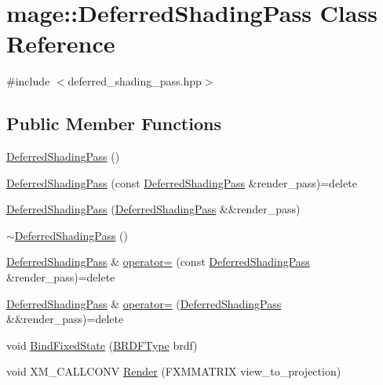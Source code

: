 \hypertarget{classmage_1_1_deferred_shading_pass}{}\section{mage\+:\+:Deferred\+Shading\+Pass Class Reference}
\label{classmage_1_1_deferred_shading_pass}


{\ttfamily \#include $<$deferred\+\_\+shading\+\_\+pass.\+hpp$>$}

\subsection*{Public Member Functions}
\begin{DoxyCompactItemize}
\item 
\hyperlink{classmage_1_1_deferred_shading_pass_a348c86ce12342110299739d8d63c6aaf}{Deferred\+Shading\+Pass} ()
\item 
\hyperlink{classmage_1_1_deferred_shading_pass_a4820a800b8ffc4cf0a7d155b09b71210}{Deferred\+Shading\+Pass} (const \hyperlink{classmage_1_1_deferred_shading_pass}{Deferred\+Shading\+Pass} \&render\+\_\+pass)=delete
\item 
\hyperlink{classmage_1_1_deferred_shading_pass_a1aff32dc53f6e377728898ba362d0116}{Deferred\+Shading\+Pass} (\hyperlink{classmage_1_1_deferred_shading_pass}{Deferred\+Shading\+Pass} \&\&render\+\_\+pass)
\item 
\hyperlink{classmage_1_1_deferred_shading_pass_a0feba3a73c56e1c07abe19fddd890f76}{$\sim$\+Deferred\+Shading\+Pass} ()
\item 
\hyperlink{classmage_1_1_deferred_shading_pass}{Deferred\+Shading\+Pass} \& \hyperlink{classmage_1_1_deferred_shading_pass_afcb5b0299030a2a60dcb3685ca875e3e}{operator=} (const \hyperlink{classmage_1_1_deferred_shading_pass}{Deferred\+Shading\+Pass} \&render\+\_\+pass)=delete
\item 
\hyperlink{classmage_1_1_deferred_shading_pass}{Deferred\+Shading\+Pass} \& \hyperlink{classmage_1_1_deferred_shading_pass_a1a3ee174f93d538bd1c8c6a37f1e94f7}{operator=} (\hyperlink{classmage_1_1_deferred_shading_pass}{Deferred\+Shading\+Pass} \&\&render\+\_\+pass)=delete
\item 
void \hyperlink{classmage_1_1_deferred_shading_pass_aa6e4edd14aeaf5388b1f57388dd3aa3e}{Bind\+Fixed\+State} (\hyperlink{namespacemage_ae7a7a03a7b34d7e2689689bb8295cd38}{B\+R\+D\+F\+Type} brdf)
\item 
void X\+M\+\_\+\+C\+A\+L\+L\+C\+O\+NV \hyperlink{classmage_1_1_deferred_shading_pass_a387b47850cf2f9a8259f0a9a8757ec04}{Render} (F\+X\+M\+M\+A\+T\+R\+IX view\+\_\+to\+\_\+projection)
\end{DoxyCompactItemize}
